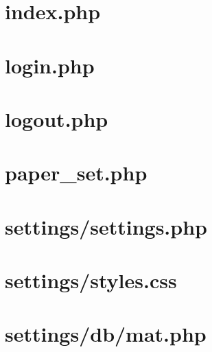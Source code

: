 \documentclass[12pt,a4paper,twoside,openany]{report}
\begin{document}
\newpage\section{index.php}


\newpage\section{login.php}


\newpage\section{logout.php}


\newpage\section{paper\_set.php}


\newpage\section{settings/settings.php}


\newpage\section{settings/styles.css}


\newpage\section{settings/db/mat.php}

\end{document}
